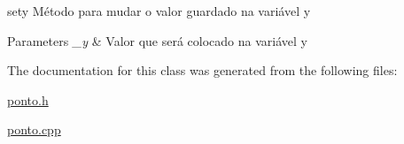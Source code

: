 sety Método para mudar o valor guardado na variável y 


\begin{DoxyParams}{Parameters}
{\em \+\_\+y} & Valor que será colocado na variável y \\
\hline
\end{DoxyParams}


The documentation for this class was generated from the following files\+:\begin{DoxyCompactItemize}
\item 
\mbox{\hyperlink{ponto_8h}{ponto.\+h}}\item 
\mbox{\hyperlink{ponto_8cpp}{ponto.\+cpp}}\end{DoxyCompactItemize}
